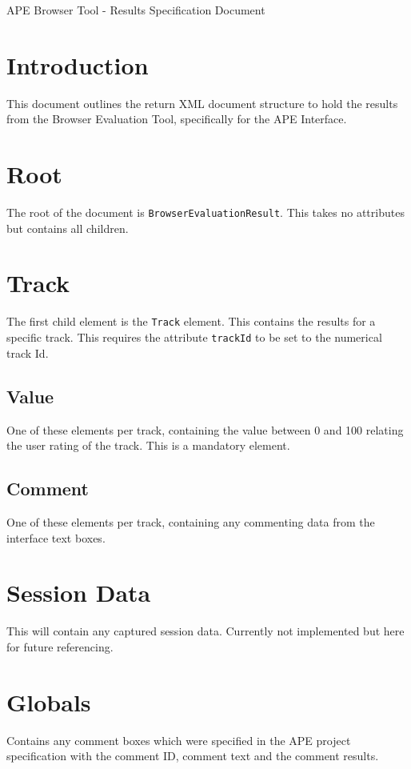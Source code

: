 \documentclass{article}
\begin{document}
\large APE Browser Tool - Results Specification Document

\section{Introduction}
This document outlines the return XML document structure to hold the results from the Browser Evaluation Tool, specifically for the APE Interface.

\section{Root}
The root of the document is \texttt{BrowserEvaluationResult}. This takes no attributes but contains all children.

\section{Track}
The first child element is the \texttt{Track} element. This contains the results for a specific track. This requires the attribute \texttt{trackId} to be set to the numerical track Id.

\subsection{Value}
One of these elements per track, containing the value between 0 and 100 relating the user rating of the track. This is a mandatory element.

\subsection{Comment}
One of these elements per track, containing any commenting data from the interface text boxes.

\section{Session Data}
This will contain any captured session data. Currently not implemented but here for future referencing.

\section{Globals}
Contains any comment boxes which were specified in the APE project specification with the comment ID, comment text and the comment results.
\end{document}
